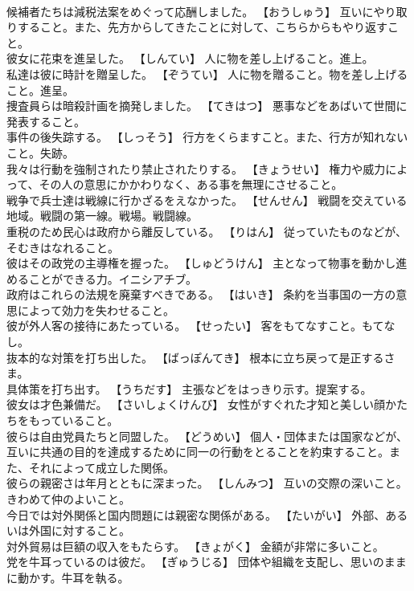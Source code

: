 \documentclass[8pt]{extreport}
\begin{document}
\begin{CJK}{UTF8}{min}
\\	候補者たちは減税法案をめぐって応酬しました。	【おうしゅう】 互いにやり取りすること。また、先方からしてきたことに対して、こちらからもやり返すこと。
\\	彼女に花束を進呈した。	【しんてい】 人に物を差し上げること。進上。
\\	私達は彼に時計を贈呈した。	【ぞうてい】 人に物を贈ること。物を差し上げること。進呈。
\\	捜査員らは暗殺計画を摘発しました。	【てきはつ】 悪事などをあばいて世間に発表すること。
\\	事件の後失踪する。	【しっそう】 行方をくらますこと。また、行方が知れないこと。失跡。
\\	我々は行動を強制されたり禁止されたりする。	【きょうせい】 権力や威力によって、その人の意思にかかわりなく、ある事を無理にさせること。
\\	戦争で兵士達は戦線に行かざるをえなかった。	【せんせん】 戦闘を交えている地域。戦闘の第一線。戦場。戦闘線。
\\	重税のため民心は政府から離反している。	【りはん】 従っていたものなどが、そむきはなれること。
\\	彼はその政党の主導権を握った。	【しゅどうけん】 主となって物事を動かし進めることができる力。イニシアチブ。
\\	政府はこれらの法規を廃棄すべきである。	【はいき】 条約を当事国の一方の意思によって効力を失わせること。
\\	彼が外人客の接待にあたっている。	【せったい】 客をもてなすこと。もてなし。
\\	抜本的な対策を打ち出した。	【ばっぽんてき】 根本に立ち戻って是正するさま。
\\	具体策を打ち出す。	【うちだす】 主張などをはっきり示す。提案する。
\\	彼女は才色兼備だ。	【さいしょくけんび】 女性がすぐれた才知と美しい顔かたちをもっていること。
\\	彼らは自由党員たちと同盟した。	【どうめい】 個人・団体または国家などが、互いに共通の目的を達成するために同一の行動をとることを約束すること。また、それによって成立した関係。
\\	彼らの親密さは年月とともに深まった。	【しんみつ】 互いの交際の深いこと。きわめて仲のよいこと。
\\	今日では対外関係と国内問題には親密な関係がある。	【たいがい】 外部、あるいは外国に対すること。
\\	対外貿易は巨額の収入をもたらす。	【きょがく】 金額が非常に多いこと。
\\	党を牛耳っているのは彼だ。	【ぎゅうじる】 団体や組織を支配し、思いのままに動かす。牛耳を執る。

\end{CJK}
\end{document}
